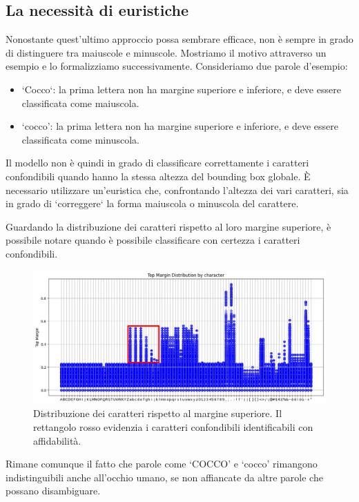 \subsection{La necessità di euristiche}

Nonostante quest'ultimo approccio possa sembrare efficace, non è sempre in grado di distinguere tra maiuscole e minuscole.
Mostriamo il motivo attraverso un esempio e lo formalizziamo successivamente.
Consideriamo due parole d'esempio:
\begin{itemize}
	\item `Cocco`: la prima lettera non ha margine superiore e inferiore, e deve essere classificata come maiuscola.
	\item `cocco': la prima lettera non ha margine superiore e inferiore, e deve essere classificata come minuscola.
\end{itemize}

Il modello non è quindi in grado di classificare correttamente i caratteri confondibili quando hanno la stessa altezza del bounding box globale.
È necessario utilizzare un'euristica che, confrontando l'altezza dei vari caratteri, sia in grado di `correggere` la forma maiuscola o minuscola del carattere.

Guardando la distribuzione dei caratteri rispetto al loro margine superiore, è possibile notare quando è possibile classificare con certezza i caratteri confondibili.

\begin{figure}[H]
	\centering
	\includegraphics[width=1\textwidth]{images/top_margin_distribution_highlight.png}
	\caption{Distribuzione dei caratteri rispetto al margine superiore. Il rettangolo rosso evidenzia i caratteri confondibili identificabili con affidabilità.}
	\label{fig:top_margin_distribution_highlight.png}
\end{figure}

Rimane comunque il fatto che parole come `COCCO' e `cocco' rimangono indistinguibili anche all'occhio umano, se non affiancate da altre parole che possano disambiguare.

